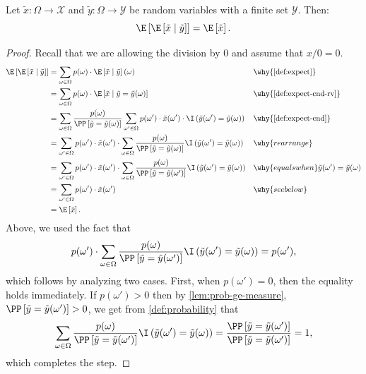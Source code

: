 \begin{theorem} \label{thm:total-expectation}
Let $\tilde{x} \colon \Omega \to \mathcal{X}$ and $\tilde{y} \colon \Omega \to \mathcal{Y}$ be random variables with a finite set $\mathcal{Y}$. Then:
\[
\E\left[\E\left[\tilde{x} \mid  \tilde{y}\right]\right] = \E \left[ \tilde{x} \right].
\]
\end{theorem}
\begin{proof}
Recall that we are allowing the division by 0 and assume that $x / 0 = 0$.
\begin{align*} 
  \E\left[\E\left[\tilde{x} \mid  \tilde{y}\right]\right]
  &= \sum_{\omega \in \Omega }  p (\omega) \cdot  \E \left[ \tilde{x} \mid  \tilde{y} \right](\omega) && \why{\cref{def:expect}}\\
  &= \sum_{\omega \in \Omega }  p (\omega) \cdot  \E \left[ \tilde{x} \mid  \tilde{y}  = \tilde{y}(\omega) \right] && \why{\cref{def:expect-cnd-rv}}\\
  &= \sum_{\omega \in \Omega }  \frac{p(\omega)}{\PP \left[ \tilde{y}= \tilde{y}(\omega)\right]} \sum_{\omega'\in \Omega } p(\omega') \cdot \tilde{x}(\omega') \cdot  \I\left( \tilde{y}(\omega') = \tilde{y}(\omega) \right)   && \why{\cref{def:expect-cnd}} \\
  &=  \sum_{\omega'\in \Omega } p(\omega') \cdot \tilde{x}(\omega') \cdot \sum_{\omega \in \Omega }  \frac{p(\omega)}{\PP \left[ \tilde{y}= \tilde{y}(\omega)\right]} \I\left( \tilde{y}(\omega') = \tilde{y}(\omega) \right)  && \why{rearrange} \\
  &=  \sum_{\omega'\in \Omega } p(\omega') \cdot \tilde{x}(\omega') \cdot \sum_{\omega \in \Omega }  \frac{p(\omega)}{\PP \left[ \tilde{y} = \tilde{y}(\omega')\right]} \I\left( \tilde{y}(\omega') = \tilde{y}(\omega) \right)  && \why{equals when } \tilde{y}(\omega') = \tilde{y}(\omega) \\
  &=  \sum_{\omega'\in \Omega } p(\omega') \cdot \tilde{x}(\omega')    && \why{see below}  \\
  &= \E \left[ \tilde{x} \right].
\end{align*}
Above, we used the fact that
\[
  p(\omega') \cdot \sum_{\omega \in \Omega }  \frac{p(\omega)}{\PP \left[ \tilde{y} = \tilde{y}(\omega')\right]} \I\left( \tilde{y}(\omega') = \tilde{y}(\omega) \right) =  p(\omega'),  
\]
which follows by analyzing two cases. First, when $p(\omega') = 0$, then the equality holds immediately. If $p(\omega') > 0$ then by \cref{lem:prob-ge-measure}, $\PP \left[ \tilde{y} = \tilde{y}(\omega')\right] > 0$, we get from \cref{def:probability} that
\[
  \sum_{\omega \in \Omega } \frac{p(\omega)}{\PP \left[ \tilde{y} = \tilde{y}(\omega')\right]} \I\left( \tilde{y}(\omega') = \tilde{y}(\omega) \right) 
    =
    \frac{\PP \left[ \tilde{y} = \tilde{y}(\omega')\right]}{\PP \left[ \tilde{y} = \tilde{y}(\omega')\right]}
    = 1,
  \]
  which completes the step.
\end{proof}
